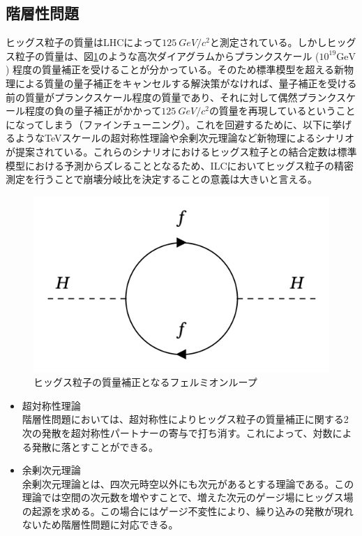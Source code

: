 \subsection{階層性問題}
ヒッグス粒子の質量はLHCによって$\SI{125}{GeV/c^2}$と測定されている。しかしヒッグス粒子の質量は、図\ref{hierarchy}のような高次ダイアグラムからプランクスケール ($10^{19} \mathrm{GeV}$) 程度の質量補正を受けることが分かっている。そのため標準模型を超える新物理による質量の量子補正をキャンセルする解決策がなければ、量子補正を受ける前の質量がプランクスケール程度の質量であり、それに対して偶然プランクスケール程度の負の量子補正がかかって$\SI{125}{GeV/c^2}$の質量を再現しているということになってしまう（ファインチューニング）。これを回避するために、以下に挙げるようなTeVスケールの超対称性理論や余剰次元理論など新物理によるシナリオが提案されている。これらのシナリオにおけるヒッグス粒子との結合定数は標準模型における予測からズレることとなるため、ILCにおいてヒッグス粒子の精密測定を行うことで崩壊分岐比を決定することの意義は大きいと言える。
\begin{figure}[H]
	\begin{center}
 \includegraphics[keepaspectratio, scale=0.3]
 	{Figure/Introduction/feynman.png}
 		\caption[階層性問題のフェルミオンループ]{ヒッグス粒子の質量補正となるフェルミオンループ}
 		\label{hierarchy}
	\end{center}
\end{figure}
\begin{itemize}
\item{超対称性理論}\\
階層性問題においては、超対称性によりヒッグス粒子の質量補正に関する2次の発散を超対称性パートナーの寄与で打ち消す。これによって、対数による発散に落とすことができる。
\item{余剰次元理論}\\
余剰次元理論とは、四次元時空以外にも次元があるとする理論である。この理論では空間の次元数を増やすことで、増えた次元のゲージ場にヒッグス場の起源を求める。この場合にはゲージ不変性により、繰り込みの発散が現れないため階層性問題に対応できる。
\end{itemize}
